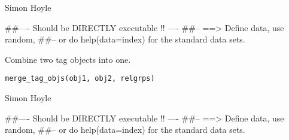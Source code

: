 \documentclass[a4paper]{book}
\begin{document}
%
\begin{Author}\relax

Simon Hoyle
\end{Author}
%
\begin{Examples}
\begin{ExampleCode}
##---- Should be DIRECTLY executable !! ----
##-- ==>  Define data, use random,
##--	or do  help(data=index)  for the standard data sets.

\end{ExampleCode}
\end{Examples}
%
\begin{Description}\relax

Combine two tag objects into one. 
\end{Description}
%
\begin{Usage}
\begin{verbatim}
merge_tag_objs(obj1, obj2, relgrps)
\end{verbatim}
\end{Usage}
%
\begin{Arguments}
\begin{ldescription}
\item[\code{obj1}] 


\item[\code{obj2}] 


\item[\code{relgrps}] 


\end{ldescription}
\end{Arguments}
%
\begin{Author}\relax

Simon Hoyle
\end{Author}
%
\begin{Examples}
\begin{ExampleCode}
##---- Should be DIRECTLY executable !! ----
##-- ==>  Define data, use random,
##--	or do  help(data=index)  for the standard data sets.

\end{ExampleCode}
\end{Examples}
\end{document}
